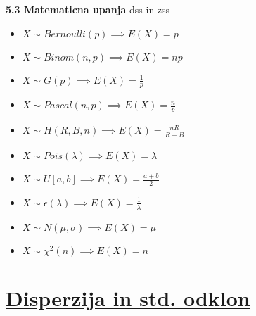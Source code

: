 \documentclass{article}
\begin{document}
\begin{multicols}{3}
\textbf{5.3 Matematicna upanja} dss in zss
\begin{itemize}
    \item \begin{math}
        X \sim Bernoulli(p) \implies E(X) = p
    \end{math}
    \item \begin{math}
        X \sim Binom(n, p) \implies E(X) = np
    \end{math}
    \item \begin{math}
        X \sim G(p) \implies E(X) = \frac{1}{p}
    \end{math}
    \item \begin{math}
        X \sim Pascal(n, p) \implies E(X) = \frac{n}{p}
    \end{math}
    \item
    \begin{math}
        X \sim H(R, B, n) \implies E(X) = \frac{nR}{R + B}
    \end{math}
    \item \begin{math}
        X \sim Pois(\lambda) \implies E(X) = \lambda
    \end{math}
    \item \begin{math}
        X \sim U[a, b] \implies E(X) = \frac{a + b}{2}
    \end{math}
    \item  \begin{math}
        X \sim \epsilon(\lambda) \implies E(X) = \frac{1}{\lambda}
    \end{math}
    \item \begin{math}
        X \sim N(\mu, \sigma ) \implies E(X) = \mu
    \end{math}
    \item \begin{math}
        X \sim \chi^{2}(n) \implies E(X) = n
    \end{math}
\end{itemize}

\section{\underline{Disperzija in std. odklon}}


\end{multicols}
\end{document}
